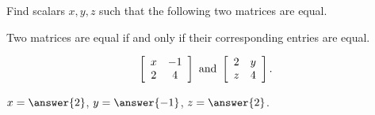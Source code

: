 \documentclass{ximera}
\author{Zack Reed}
\begin{document}
\begin{problem}
  Find scalars $x,y,z$ such that the following two matrices are equal.

  \begin{hint}

    Two matrices are equal if and only if their corresponding entries are equal. 

  \end{hint}
  \begin{equation*}
    \startmat{cc}
      x & -1 \\
      2 & 4
    \stopmat
    \quad\mbox{and}\quad
    \startmat{cc}
      2 & y \\
      z & 4
    \stopmat.
  \end{equation*}

    $x=\answer{2}$, $y=\answer{-1}$, $z=\answer{2}$.

\end{problem}
\end{document}

